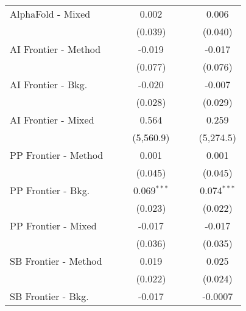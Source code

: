 \begin{tabular}{lcccccc}
   AlphaFold - Mixed    &               &             & 0.002         &               &             & 0.006\\   
                        &               &             & (0.039)       &               &             & (0.040)\\   
   AI Frontier - Method &               &             & -0.019        &               &             & -0.017\\   
                        &               &             & (0.077)       &               &             & (0.076)\\   
   AI Frontier - Bkg.   &               &             & -0.020        &               &             & -0.007\\   
                        &               &             & (0.028)       &               &             & (0.029)\\   
   AI Frontier - Mixed  &               &             & 0.564         &               &             & 0.259\\   
                        &               &             & (5,560.9)     &               &             & (5,274.5)\\   
   PP Frontier - Method &               &             & 0.001         &               &             & 0.001\\   
                        &               &             & (0.045)       &               &             & (0.045)\\   
   PP Frontier - Bkg.   &               &             & 0.069$^{***}$ &               &             & 0.074$^{***}$\\   
                        &               &             & (0.023)       &               &             & (0.022)\\   
   PP Frontier - Mixed  &               &             & -0.017        &               &             & -0.017\\   
                        &               &             & (0.036)       &               &             & (0.035)\\   
   SB Frontier - Method &               &             & 0.019         &               &             & 0.025\\   
                        &               &             & (0.022)       &               &             & (0.024)\\   
   SB Frontier - Bkg.   &               &             & -0.017        &               &             & -0.0007\\   

\end{tabular}
